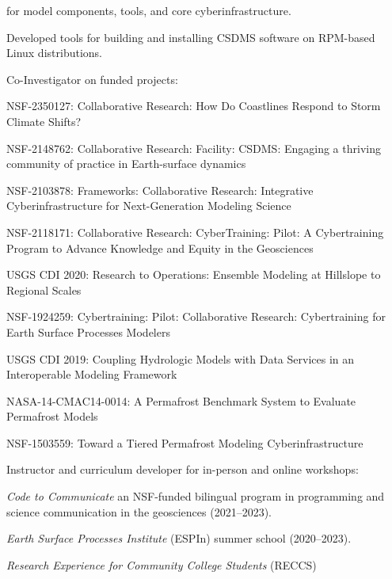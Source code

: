 \begin{compactitem}[\itembullet]
    for model components, tools, and core cyberinfrastructure.
  \item
    Developed tools for building and installing CSDMS software on
    RPM-based Linux distributions.
  \item Co-Investigator on funded projects:
    \begin{compactitem}[\itembullet]
      \item
        NSF-2350127: Collaborative Research: How Do Coastlines Respond to Storm
        Climate Shifts?
      \item
        NSF-2148762: Collaborative Research: Facility: CSDMS: Engaging a
        thriving community of practice in Earth-surface dynamics
        \item
        NSF-2103878: Frameworks: Collaborative Research: Integrative
        Cyberinfrastructure for Next-Generation Modeling Science
      \item
        NSF-2118171: Collaborative Research: CyberTraining: Pilot: A
        Cybertraining Program to Advance Knowledge and Equity in the Geosciences
      \item
        USGS CDI 2020: Research to Operations: Ensemble Modeling at
        Hillslope to Regional Scales
      \item
        NSF-1924259: Cybertraining: Pilot: Collaborative Research:
        Cybertraining for Earth Surface Processes Modelers
      \item
        USGS CDI 2019: Coupling Hydrologic Models with Data Services
        in an Interoperable Modeling Framework
      \item
        NASA-14-CMAC14-0014: A Permafrost Benchmark System to Evaluate
        Permafrost Models
      \item
        NSF-1503559: Toward a Tiered Permafrost Modeling Cyberinfrastructure
    \end{compactitem}
  \item Instructor and curriculum developer for in-person and online workshops:
    \begin{compactitem}[\itembullet]
      \item
        \textit{Code to Communicate} an NSF-funded bilingual program in
        programming and science communication in the geosciences (2021--2023).
      \item
        \textit{Earth Surface Processes Institute} (ESPIn) summer school
        (2020--2023).
      \item
        \textit{Research Experience for Community College Students} (RECCS)

\end{compactitem}
\end{compactitem}
